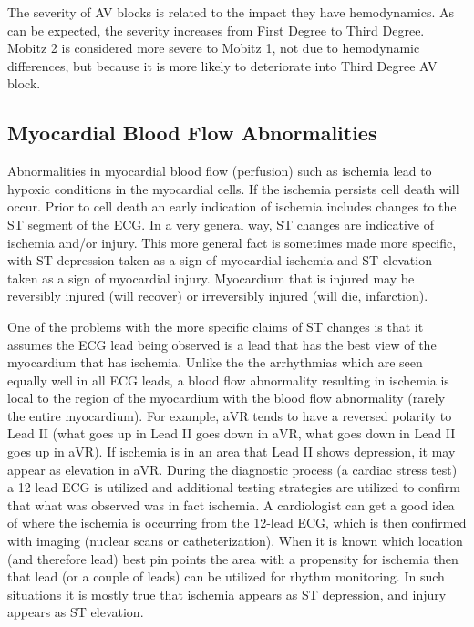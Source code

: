 
The severity of AV blocks is related to the impact they have hemodynamics. As can be expected, the severity increases from First Degree to Third Degree. Mobitz 2 is considered more severe to Mobitz 1, not due to hemodynamic differences, but because it is more likely to deteriorate into Third Degree AV block.

\subsection{Myocardial Blood Flow Abnormalities}

Abnormalities in myocardial blood flow (perfusion) such as ischemia lead to hypoxic conditions in the myocardial cells. If the ischemia persists cell death will occur. Prior to cell death an early indication of ischemia includes changes to the ST segment of the ECG. In a very general way, ST changes are indicative of ischemia and/or injury. This more general fact is sometimes made more specific, with ST depression taken as a sign of myocardial ischemia and ST elevation taken as a sign of myocardial injury. Myocardium that is injured may be reversibly injured (will recover) or irreversibly injured (will die, infarction). 


One of the problems with the more specific claims of ST changes is that it assumes the ECG lead being observed is a lead that has the best view of the myocardium that has ischemia. Unlike the the arrhythmias which are seen equally well in all ECG leads, a blood flow abnormality resulting in ischemia is local to the region of the myocardium with the blood flow abnormality (rarely the entire myocardium). For example, aVR tends to have a reversed polarity to Lead II (what goes up in Lead II goes down in aVR, what goes down in Lead II goes up in aVR). If ischemia is in an area that Lead II shows depression, it may appear as elevation in aVR. During the diagnostic process (a cardiac stress test) a 12 lead ECG is utilized and additional testing strategies are utilized to confirm that what was observed was in fact ischemia. A cardiologist can get a good idea of where the ischemia is occurring from the 12-lead ECG, which is then confirmed with imaging (nuclear scans or catheterization). When it is known which location (and therefore lead) best pin points the area with a propensity for ischemia then that lead (or a couple of leads) can be utilized for rhythm monitoring. In such situations it is mostly true that ischemia appears as ST depression, and injury appears as ST elevation.

